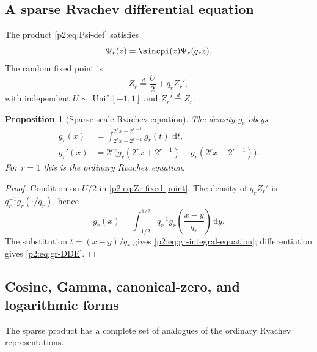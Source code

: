 \documentclass[11pt,oneside]{article}
\newtheorem{proposition}[theorem]{Proposition}
\theoremstyle{definition}
\newcommand{\dd}{\,\mathrm d}
\begin{document}
\subsection{A sparse Rvachev differential equation}

The product \eqref{p2:eq:Psi-def} satisfies
\begin{equation}
 \Psi_r(z)=\sincpi(z)\Psi_r(q_rz).                          \label{p2:eq:Psi-refinement}
\end{equation}
The random fixed point is
\begin{equation}
 Z_r\overset{d}=\frac{U}{2}+q_rZ_r',                        \label{p2:eq:Zr-fixed-point}
\end{equation}
with independent $U\sim\operatorname{Unif}[-1,1]$ and
$Z_r'\overset d=Z_r$.

\begin{proposition}[Sparse-scale Rvachev equation]
\label{p2:prop:sparse-DDE}
The density $g_r$ obeys
\begin{align}
 g_r(x)
 &=\int_{2^rx-2^{r-1}}^{2^rx+2^{r-1}}g_r(t)\,\dd t,        \label{p2:eq:gr-integral-equation}\\
 g_r'(x)
 &=2^r\bigl(g_r(2^rx+2^{r-1})-g_r(2^rx-2^{r-1})\bigr).     \label{p2:eq:gr-DDE}
\end{align}
For $r=1$ this is the ordinary Rvachev equation.
\end{proposition}

\begin{proof}
Condition on $U/2$ in \eqref{p2:eq:Zr-fixed-point}.  The density of $q_rZ_r'$ is
$q_r^{-1}g_r(\cdot/q_r)$, hence
\[
 g_r(x)=\int_{-1/2}^{1/2}q_r^{-1}
 g_r\!\left(\frac{x-y}{q_r}\right)\dd y.
\]
The substitution $t=(x-y)/q_r$ gives
\eqref{p2:eq:gr-integral-equation}; differentiation gives
\eqref{p2:eq:gr-DDE}.
\end{proof}

\subsection{Cosine, Gamma, canonical-zero, and logarithmic forms}

The sparse product has a complete set of analogues of the ordinary Rvachev
representations.
\end{document}
